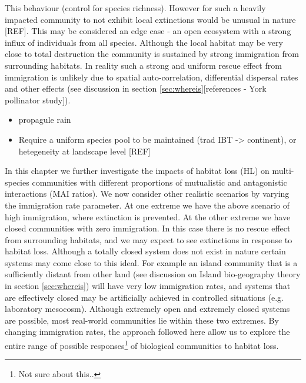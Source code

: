 \begin{itemize}
This behaviour  (control for species richness). However for such a heavily impacted community to not exhibit local extinctions would be unusual in nature [REF]. This may be considered an edge case - an open ecosystem with a strong influx of individuals from all species. Although the local habitat may be very close to total destruction the community is sustained by strong immigration from surrounding habitats. In reality such a strong and uniform rescue effect from immigration is unlikely due to spatial auto-correlation, differential dispersal rates and other effects (see discussion in section \ref{sec:whereis}[references - York pollinator study]).

\begin{itemize}
	\item propagule rain
	\item Require a uniform species pool to be maintained (trad IBT -> continent), or hetegeneity at landscape level [REF]
\end{itemize}

In this chapter we further investigate the impacts of habitat loss (HL)  on multi-species communities with different proportions of mutualistic and antagonistic interactions (MAI ratios). We now consider other realistic scenarios by varying the immigration rate parameter. At one extreme we have the above scenario of high immigration, where extinction is prevented. At the other extreme we have closed communities with zero immigration. In this case there is no rescue effect from surrounding habitats, and we may expect to see extinctions in response to habitat loss. Although a totally closed system does not exist in nature certain systems may come close to this ideal. For example an island community that is a sufficiently distant from other land (see discussion on Island bio-geography theory in section \ref{sec:whereis}) will have very low immigration rates, and systems that are effectively closed may be artificially achieved in controlled situations (e.g. laboratory mesocosm). Although extremely open and extremely closed systems are possible, most real-world communities lie within these two extremes. By changing immigration rates, the approach followed here allow us to explore the entire range of possible responses\footnote{Not sure about this..} of biological communities to habitat loss.


\end{itemize}
